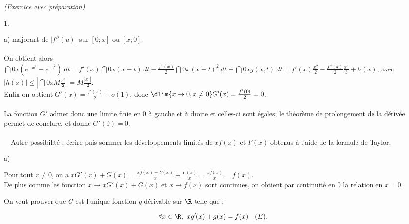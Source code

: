 \documentclass[11pt]{article}%
\begin{document}
\begin{exercice}{\it (Exercice avec préparation)}
\begin{noliste}{1.}
\begin{noliste}{a)}
majorant de $| f''(u) |$ sur $[0 ; x]$ ou $[x ; 0]$. \\
\\
 On obtient alors $\dint{0}{x} ( e^{-x^{2}} - e^{-t^{2}} )\ dt = f'(x)
\dint{0}{x} (x-t)\ dt - \frac{f''(x)}{2} \dint{0}{x} ( x-t)^{2}\ dt +
\dint{0}{x} g(x,t)\ dt = f'(x) \frac{x^{2}}{2} - \frac{f''(x)}{2}
\frac{x^{3}}{3} + h(x)$, avec $| h(x) | \leq | \dint{0}{x} M
\frac{x^{3}}{2} | = M \frac{ | x^{4} |}{2}$. \\
 Enfin on obtient $G'(x) = \frac{f'(x)}{2} + o (1)$, donc $ \dlim{x
\rightarrow 0, x \neq 0} G'(x) = \frac{f'(0)}{2} = 0$. \\
\\
 La fonction $G'$ admet donc une limite finie en 0 à gauche et à droite
et celles-ci sont égales; le théorème de prolongement de la dérivée
permet de conclure, et donne $G'(0) = 0$. \\
\\\
\
 Autre possibilité : écrire puis sommer les développements limités de
$x f(x)$ et $F(x)$ obtenus à l'aide de la formule de Taylor.
 \end{noliste}
 \item
 \begin{noliste}{a)}
 \setlength{\itemsep}{2mm} 
 \item Pour tout $x \neq 0$, on a $x G'(x) + G(x) = \frac{x f(x) -
F(x)}{x} + \frac{F(x)}{x} = \frac{x f(x)}{x} = f(x)$. \\
 De plus comme les fonction $x \rightarrow x G'(x) + G(x)$ et $x
\rightarrow f(x)$ sont continues, on obtient par continuité en 0 la
relation en $x = 0$. \\
 \item On veut prouver que $G$ est l'unique fonction $g$ dérivable sur
$\R$ telle que : 
 
\[
 \forall x \in \R,\ x g'(x) + g(x) = f(x) \ \ \ (E). 
 
\]
\end{noliste}
\end{noliste}
\end{exercice}
\end{document}
